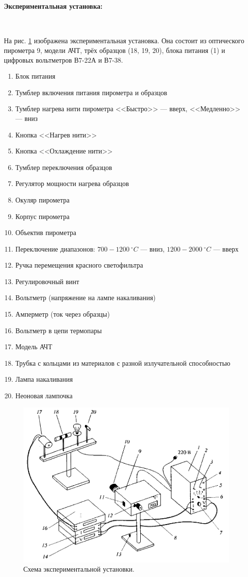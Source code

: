 \documentclass[a4paper, 12pt]{article}
\newcommand{\parag}[1]{\paragraph*{#1:}}
\begin{document}
\parag {Экспериментальная установка} ~

На рис. \ref{pic:work} изображена экспериментальная установка. Она состоит из оптического пирометра 9, модели АЧТ, трёх образцов (18, 19, 20), блока питания (1) и цифровых вольтметров В7-22А и В7-38.

\begin{enumerate}
    \item Блок питания
    \item Тумблер включения питания пирометра и образцов
    \item Тумблер нагрева нити пирометра <<Быстро>> --- вверх, <<Медленно>> --- вниз
    \item Кнопка <<Нагрев нити>>
    \item Кнопка <<Охлаждение нити>>
    \item Тумблер переключения образцов
    \item Регулятор мощности нагрева образцов
    \item Окуляр пирометра
    \item Корпус пирометра
    \item Объектив пирометра
    \item Переключение диапазонов: $700-1200 ~^\circ C$ --- вниз, $1200-2000 ~^\circ C$ --- вверх
    \item Ручка перемещения красного светофильтра
    \item Регулировочный винт
    \item Вольтметр (напряжение на лампе накаливания)
    \item Амперметр (ток через образцы)
    \item Вольтметр в цепи термопары
    \item Модель АЧТ
    \item Трубка с кольцами из материалов с разной излучательной способностью
    \item Лампа накаливания
    \item Неоновая лампочка
\end{enumerate}

\begin{figure}[!h]
    \includegraphics[scale = 0.4]{Workplace}
    \centering
    \caption{Схема экспериментальной установки.}
    \label{pic:work}
\end{figure}
\end{document}
